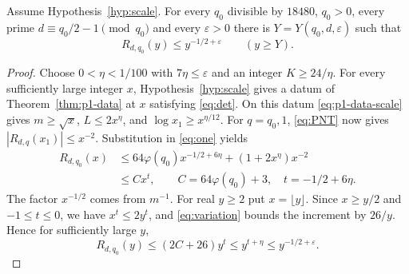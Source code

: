 \begin{theorem}\label{thm:all-y}
Assume Hypothesis~\ref{hyp:scale}. For every $q_0$ divisible by $18480$, $q_0>0$, every prime $d\equiv q_0/2-1\pmod{q_0}$ and every $\varepsilon>0$ there is $Y=Y(q_0,d,\varepsilon)$ such that
\begin{equation}
 R_{d,q_0}(y)\le y^{-1/2+\varepsilon}\qquad(y\ge Y).\label{eq:real}
\end{equation}
\end{theorem}
\begin{proof}
Choose \(0<\eta<1/100\) with \(7\eta\le\varepsilon\) and an integer
\(K\ge24/\eta\). For every sufficiently large integer \(x\),
Hypothesis~\ref{hyp:scale} gives a datum of Theorem~\ref{thm:p1-data}
at \(x\) satisfying \eqref{eq:det}. On this datum \eqref{eq:p1-data-scale}
gives \(m\ge\sqrt{x}\), \(L\le2x^\eta\), and \(\log x_1\ge x^{\eta/12}\).
For \(q=q_0,1\), \eqref{eq:PNT} now gives \(|R_{d,q}(x_1)|\le x^{-2}\).
Substitution in \eqref{eq:one} yields
\begin{align*}
 R_{d,q_0}(x)&\le64\varphi(q_0)x^{-1/2+6\eta}
                 +(1+2x^\eta)x^{-2}\\
              &\le C x^t,\qquad C=64\varphi(q_0)+3,\quad t=-1/2+6\eta .
\end{align*}
The factor \(x^{-1/2}\) comes from \(m^{-1}\). For real \(y\ge2\) put
\(x=\lfloor y\rfloor\). Since \(x\ge y/2\) and \(-1\le t\le0\), we have
\(x^t\le2y^t\), and \eqref{eq:variation} bounds the increment by \(26/y\).
Hence for sufficiently large \(y\),
\[
 R_{d,q_0}(y)\le(2C+26)y^t\le y^{t+\eta}\le y^{-1/2+\varepsilon}.
\]
\end{proof}


